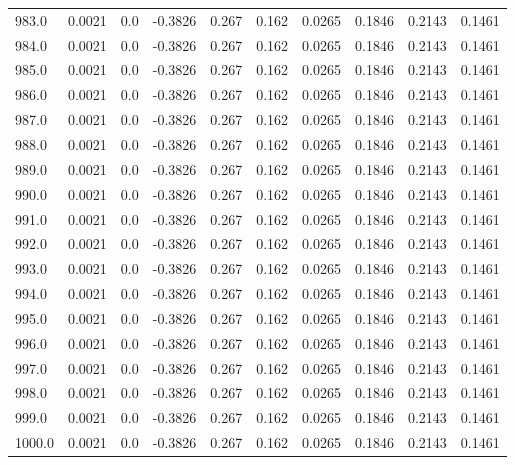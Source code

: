 \begin{longtable}{lrrrrrrrrr}
983.0 & 0.0021 & 0.0 & -0.3826 & 0.267 & 0.162 & 0.0265 & 0.1846 & 0.2143 & 0.1461 \\
984.0 & 0.0021 & 0.0 & -0.3826 & 0.267 & 0.162 & 0.0265 & 0.1846 & 0.2143 & 0.1461 \\
985.0 & 0.0021 & 0.0 & -0.3826 & 0.267 & 0.162 & 0.0265 & 0.1846 & 0.2143 & 0.1461 \\
986.0 & 0.0021 & 0.0 & -0.3826 & 0.267 & 0.162 & 0.0265 & 0.1846 & 0.2143 & 0.1461 \\
987.0 & 0.0021 & 0.0 & -0.3826 & 0.267 & 0.162 & 0.0265 & 0.1846 & 0.2143 & 0.1461 \\
988.0 & 0.0021 & 0.0 & -0.3826 & 0.267 & 0.162 & 0.0265 & 0.1846 & 0.2143 & 0.1461 \\
989.0 & 0.0021 & 0.0 & -0.3826 & 0.267 & 0.162 & 0.0265 & 0.1846 & 0.2143 & 0.1461 \\
990.0 & 0.0021 & 0.0 & -0.3826 & 0.267 & 0.162 & 0.0265 & 0.1846 & 0.2143 & 0.1461 \\
991.0 & 0.0021 & 0.0 & -0.3826 & 0.267 & 0.162 & 0.0265 & 0.1846 & 0.2143 & 0.1461 \\
992.0 & 0.0021 & 0.0 & -0.3826 & 0.267 & 0.162 & 0.0265 & 0.1846 & 0.2143 & 0.1461 \\
993.0 & 0.0021 & 0.0 & -0.3826 & 0.267 & 0.162 & 0.0265 & 0.1846 & 0.2143 & 0.1461 \\
994.0 & 0.0021 & 0.0 & -0.3826 & 0.267 & 0.162 & 0.0265 & 0.1846 & 0.2143 & 0.1461 \\
995.0 & 0.0021 & 0.0 & -0.3826 & 0.267 & 0.162 & 0.0265 & 0.1846 & 0.2143 & 0.1461 \\
996.0 & 0.0021 & 0.0 & -0.3826 & 0.267 & 0.162 & 0.0265 & 0.1846 & 0.2143 & 0.1461 \\
997.0 & 0.0021 & 0.0 & -0.3826 & 0.267 & 0.162 & 0.0265 & 0.1846 & 0.2143 & 0.1461 \\
998.0 & 0.0021 & 0.0 & -0.3826 & 0.267 & 0.162 & 0.0265 & 0.1846 & 0.2143 & 0.1461 \\
999.0 & 0.0021 & 0.0 & -0.3826 & 0.267 & 0.162 & 0.0265 & 0.1846 & 0.2143 & 0.1461 \\
1000.0 & 0.0021 & 0.0 & -0.3826 & 0.267 & 0.162 & 0.0265 & 0.1846 & 0.2143 & 0.1461 \\
\end{longtable}